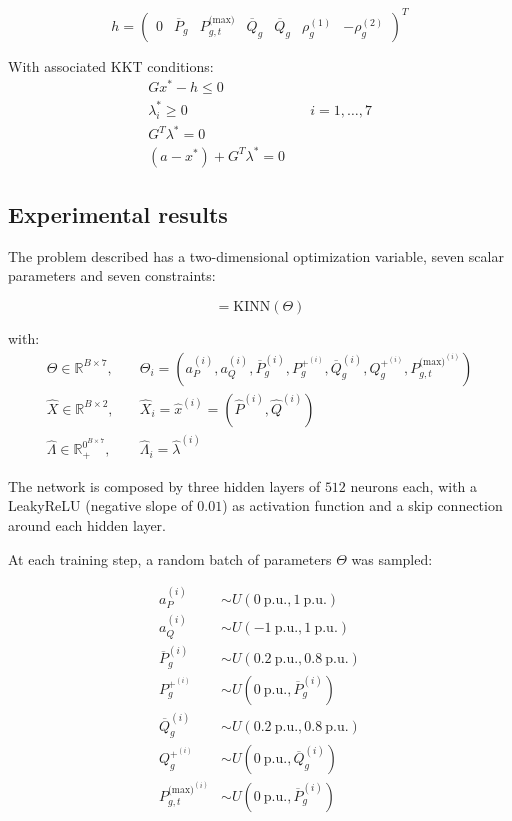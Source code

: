 \documentclass[
]{article}
\begin{document}
\begin{equation}
h = \begin{pmatrix}
0 & \overline{P}_g & P^{\textrm{(max)}}_{g,t} & \overline{Q}_g & \overline{Q}_g & \rho^{(1)}_g & -\rho^{(2)}_g
\end{pmatrix}^T
\end{equation}

With associated KKT conditions: \begin{align}
    G{x}^* - h \leq 0&\\
    \lambda_i^* \geq 0& \quad i=1,\dots, 7\\
    G^T\lambda^* = 0&\\
    (a-{x}^*) + G^T\lambda^*  = 0 &
\end{align}

\subsection{Experimental results}\label{experimental-results}

The problem described has a two-dimensional optimization variable, seven
scalar parameters and seven constraints:

\begin{equation}
 [\hat{X}, \hat\Lambda] = \mathrm{KINN}(\Theta)
\end{equation}

with: \begin{align}
\Theta \in \mathbb{R}^{B \times 7}, \quad&\Theta_{i} = (a_P^{(i)}, a_Q^{(i)},\overline{P}_g^{(i)},  P_g^{+^{(i)}}, \overline{Q}_g^{(i)},  Q_g^{+^{(i)}}, P^{\textrm{(max)}^{(i)}}_{g,t})\\
\hat{X} \in \mathbb{R}^{B \times 2}, \quad&\hat{X}_{i} = \hat{x}^{(i)} = (\hat{P}^{(i)}, \hat{Q}^{(i)})\\
\hat\Lambda \in \mathbb{R}_+^{0^{B \times 7}}, \quad&\hat\Lambda_{i} = \hat\lambda^{(i)}
\end{align}

The network is composed by three hidden layers of \(512\) neurons each,
with a LeakyReLU (negative slope of \(0.01\)) as activation function and
a skip connection around each hidden layer.

At each training step, a random batch of parameters \(\Theta\) was
sampled:

\begin{align}
a_P^{(i)} &\sim U(0~\mathrm{p.u}., 1~\mathrm{p.u.})\\
a_Q^{(i)} &\sim U(-1~\mathrm{p.u}., 1~\mathrm{p.u.})\\
\overline{P}_g^{(i)} &\sim U(0.2~\mathrm{p.u}., 0.8~\mathrm{p.u.})\\
P_g^{+^{(i)}} &\sim U(0~\mathrm{p.u}., \overline{P}_g^{(i)})\\
\overline{Q}_g^{(i)} &\sim U(0.2~\mathrm{p.u}., 0.8~\mathrm{p.u.})\\
Q_g^{+^{(i)}} &\sim U(0~\mathrm{p.u}., \overline{Q}_g^{(i)})\\
P^{\textrm{(max)}^{(i)}}_{g,t} &\sim U(0~\mathrm{p.u}., \overline{P}_g^{(i)})
\end{align}
\end{document}
